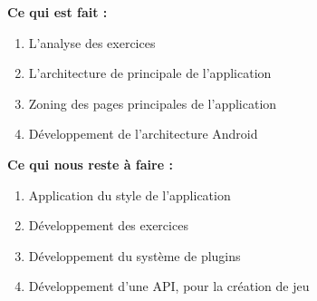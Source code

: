 \textbf{Ce qui est fait :}
\begin{enumerate}
\item L'analyse des exercices
\item L'architecture de principale de l'application
\item Zoning des pages principales de l'application
\item Développement de l'architecture Android
\end{enumerate}

\textbf{Ce qui nous reste à faire :}
\begin{enumerate}
\item Application du style de l'application
\item Développement des exercices
\item Développement du système de plugins
\item Développement d'une API, pour la création de jeu
\end{enumerate}